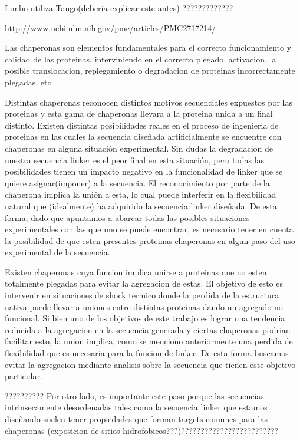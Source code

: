 Limbo utiliza Tango(deberia explicar este antes) ?????????????

http://www.ncbi.nlm.nih.gov/pmc/articles/PMC2717214/

Las chaperonas son elementos fundamentales para el correcto funcionamiento y calidad de las proteinas, interviniendo en el correcto plegado, activacion, la posible translocacion, replegamiento o degradacion de proteinas incorrectamente plegadas, etc.

Distintas chaperonas reconocen distintos motivos secuenciales expuestos por las proteinas y esta gama de chaperonas llevara a la proteina unida a un final distinto.
Existen distintas posibilidades reales en el proceso de ingenieria de proteinas en las cuales la secuencia diseñada artificialmente se encuentre con chaperonas en alguna situación experimental. Sin dudas la degradacion de nuestra secuencia linker es el peor final en esta situación, pero todas las posibilidades tienen un impacto negativo en la funcionalidad de linker que se quiere asignar(imponer) a la secuencia. El reconocimiento por parte de la chaperona implica la unión a esta, lo cual puede interferir en la flexibilidad natural que (idealmente) ha adquirido la secuencia linker diseñada. 
De esta forma, dado que apuntamos a abarcar todas las posibles situaciones experimentales con las que uno se puede encontrar, es necesario tener en cuenta la posibilidad de que esten presentes proteinas chaperonas en algun paso del uso experimental de la secuencia. 
 
Existen chaperonas cuya funcion implica unirse a proteinas que no esten totalmente plegadas para evitar la agregacion de estas. El objetivo de esto es intervenir en situaciones de shock termico donde la perdida de la estructura nativa puede llevar a uniones entre distintas proteinas dando un agregado no funcional. Si bien uno de los objetivos de este trabajo es lograr una tendencia reducida a la agregacion en la secuencia generada y ciertas chaperonas podrian facilitar esto, la union implica, como se menciono anteriormente una perdida de flexibilidad que es necesaria para la funcion de linker. De esta forma buscamos evitar la agregacion mediante analisis sobre la secuencia que tienen este objetivo particular.

??????????
Por otro lado, es importante este paso porque las secuencias intrinsecamente desordenadas tales como la secuencia linker que estamos diseñando suelen tener propiedades que forman targets comunes para las chaperonas (exposicion de sitios hidrofobicos???)?????????????????????????


